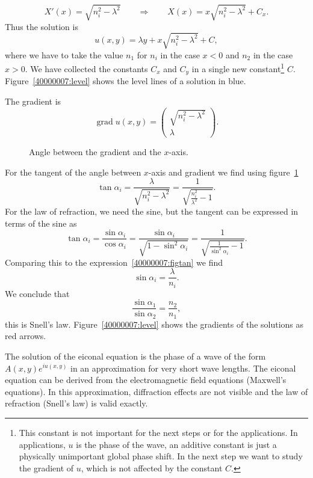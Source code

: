 \begin{loesung}
\begin{teilaufgaben}
\[
X'(x)=\sqrt{n_i^2-\lambda^2}
\qquad
\Rightarrow
\qquad
X(x)=x\sqrt{n_i^2-\lambda^2} + C_x.
\]
Thus the solution is
\[
u(x,y)=\lambda y + x\sqrt{n_i^2-\lambda^2} + C,
\]
where we have to take the value $n_1$ for $n_i$ in the case $x<0$
and $n_2$ in the case $x>0$.
We have collected the constants
$C_x$ and $C_y$ in a single new constant\footnote{This constant
is not important for the next steps or for the applications.
In applications, $u$ is the phase of the wave, an additive constant
is just a physically unimportant global phase shift.
In the next step we want to study the gradient of $u$, which is not
affected by the constant $C$.}
$C$.
Figure~\ref{40000007:level} shows the level lines of a solution in blue.
\item
The gradient is
\[
\operatorname{grad}u(x,y)
=
\begin{pmatrix}
\sqrt{n_i^2-\lambda^2}\\
\lambda
\end{pmatrix}.
\]
\begin{figure}
\centering
{}
\caption{Angle between the gradient and the $x$-axis.
\label{40000007:fig}}
\end{figure}
For the tangent of the angle between $x$-axis and gradient we find
using figure~\ref{40000007:fig}
\begin{equation}
\tan\alpha_i
=
\frac{\lambda}{\sqrt{n_i^2-\lambda^2}}
=
\frac1{\sqrt{\frac{n_i^2}{\lambda^2}-1}}.
\label{40000007:figtan}
\end{equation}
For the law of refraction, we need the sine, but the tangent can be
expressed in terms of the sine as
\[
\tan\alpha_i
=
\frac{\sin\alpha_i}{\cos\alpha_i}
=
\frac{\sin\alpha_i}{\sqrt{1-\sin^2\alpha_i}}
=
\frac{1}{\sqrt{\frac{1}{\sin^2\alpha_i}-1}}.
\]
Comparing this to the expression~\eqref{40000007:figtan}
we find
\[
\sin\alpha_i=\frac{\lambda}{n_i}.
\]
We conclude that
\[
\frac{ \sin\alpha_1}{\sin\alpha_2}=\frac{n_2}{n_1},
\]
this is Snell's law.
Figure~\ref{40000007:level} shows the gradients of the solutions
as red arrows.
\qedhere
\end{teilaufgaben}
\end{loesung}

\begin{diskussion}
The solution of the eiconal equation is the phase of a wave of the
form
$A(x,y)e^{iu(x,y)}$ in an approximation for very short wave lengths.
The eiconal equation can be derived from the electromagnetic field
equations (Maxwell's equations).
In this approximation, diffraction effects are not visible and the
law of refraction (Snell's law) is valid exactly.
\end{diskussion}
